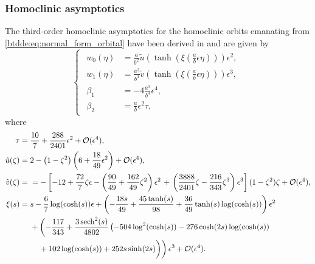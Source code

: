\subsubsection{Homoclinic asymptotics}
\label{btdde:sec:generic_bt_homoclinic_asymptotics}
The third-order homoclinic asymptotics for the homoclinic orbits emanating from \cref{btdde:eq:normal_form_orbital}
have been derived in \cite{Bosschaert@Interplay} and are given by
\begin{equation}
\label{btdde:eq:third_order_predictor_LP_tau}
\begin{cases}
\begin{aligned}
w_0(\eta)  &= \frac{a}{b^2} 
\tilde {u}\left(\tanh\left(\xi\left(\frac{a}{b}\epsilon\eta\right)\right)\right) \epsilon^2, \\
w_1(\eta)  &= \frac{a^2}{b^3}
\tilde {v}\left(\tanh\left(\xi\left(\frac{a}{b}\epsilon\eta\right)\right)\right) \epsilon^3, \\
\beta_1    &= -4 \frac{a^3}{b^4}\epsilon^4, \\
\beta_2    &= \frac{a}{b}\epsilon^2\tau,
\end{aligned}
\end{cases}
\end{equation}
where
\begin{equation}
\begin{aligned}
\label{btdde:eq:tau_utilde_vtilde_xi}
\tau ={}& \frac{10}{7} + \frac{288}{2401} \epsilon^2 + \mathcal{O}(\epsilon^4), \\
\tilde {u}(\zeta) ={}& 2 - \left(1-\zeta^2\right) \left(6 + \frac{18}{49}\epsilon^2 \right) + \mathcal{O}(\epsilon^4), \\
\tilde  v(\zeta) ={}&  = -\left[ -12 + \frac{72}{7} \zeta \epsilon - \left( \frac{90}{49} + \frac{162 }{49} \zeta^2 \right)\epsilon^2 \right.
  	 + \left. \left( \frac{3888}{2401} \zeta - \frac{216}{343}\zeta^3 \right) \epsilon^3 \right]
(1-\zeta^2) \zeta + \mathcal{O}(\epsilon^4), \\
\xi(s) ={}& s - \frac67\log(\cosh(s))\epsilon + \left( -\frac{18 s}{49}+\frac{45 \tanh (s)}{98}+\frac{36}{49} \tanh (s) \log (\cosh(s))\right)\epsilon^2 \\
          &+ \left( -\frac{117}{343} + \frac{3 \operatorname{sech}^2(s)}{4802}\left(-504 \log^2(\cosh(s))-276 \cosh (2 s) \log (\cosh (s)) \right. \right. \\
        {}& \left. \left. \phantom{\frac12} + 102 \log (\cosh (s)) + 252 s \sinh (2 s) \right) \right) \epsilon^3 + \mathcal{O}(\epsilon^4).
\end{aligned}
\end{equation}
